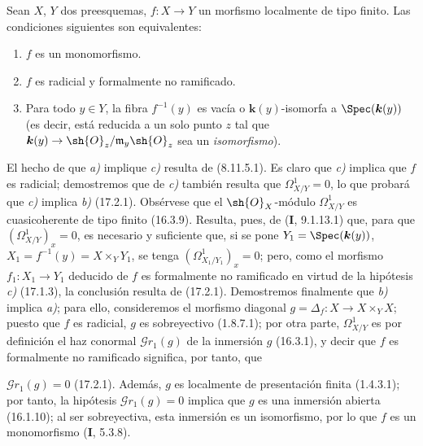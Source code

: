 \begin{proposition}[17.2.6]
\label{IV.17.2.6}
Sean $X$, $Y$ dos preesquemas, $f:X\to Y$ un morfismo localmente de tipo finito. Las condiciones siguientes son equivalentes:
\begin{enumerate}
  \item[\textup{a)}] $f$ es un monomorfismo.
  \item[\textup{b)}] $f$ es radicial y formalmente no ramificado.
  \item[\textup{c)}] Para todo $y\in Y$, la fibra $f^{-1}(y)$ es vacía o $\boldsymbol k(y)$-isomorfa a $\Spec(\boldsymbol k(y))$ \textup{(es decir, está reducida a un solo punto $z$ tal que} $\boldsymbol k(y)\to\sh{O}_z/\mathfrak{m}_y\sh{O}_z$ \textup{sea un \emph{isomorfismo})}.
\end{enumerate}
\end{proposition}

El hecho de que \emph{a)} implique \emph{c)} resulta de (8.11.5.1). Es claro que \emph{c)} implica que $f$ es radicial; demostremos que de \emph{c)} también resulta que $\varOmega_{X/Y}^1=0$, lo que probará que \emph{c)} implica \emph{b)} (17.2.1). Obsérvese que el $\sh{O}_X$-módulo $\varOmega_{X/Y}^1$ es cuasicoherente de tipo finito (16.3.9). Resulta, pues, de (\textbf I, 9.1.13.1) que, para que $(\varOmega_{X/Y}^1)_x=0$, es necesario y suficiente que, si se pone $Y_1=\Spec(\boldsymbol k(y))$, $X_1=f^{-1}(y)=X\times_Y Y_1$, se tenga $(\varOmega_{X_1/Y_1}^1)_x=0$; pero, como el morfismo $f_1:X_1\to Y_1$ deducido de $f$ es formalmente no ramificado en virtud de la hipótesis \emph{c)} (17.1.3), la conclusión resulta de (17.2.1). Demostremos finalmente que \emph{b)} implica \emph{a)}; para ello, consideremos el morfismo diagonal $g=\Delta_f:X\to X\times_Y X$; puesto que $f$ es radicial, $g$ es sobreyectivo (1.8.7.1); por otra parte, $\varOmega_{X/Y}^1$ es por definición el haz conormal $\mathscr Gr_1(g)$ de la inmersión $g$ (16.3.1), y decir que $f$ es formalmente no ramificado significa, por tanto, que

$\mathscr Gr_1(g)=0$ (17.2.1). Además, $g$ es localmente de presentación finita (1.4.3.1); por tanto, la hipótesis $\mathscr Gr_1(g)=0$ implica que $g$ es una inmersión abierta (16.1.10); al ser sobreyectiva, esta inmersión es un isomorfismo, por lo que $f$ es un monomorfismo (\textbf I, 5.3.8).
